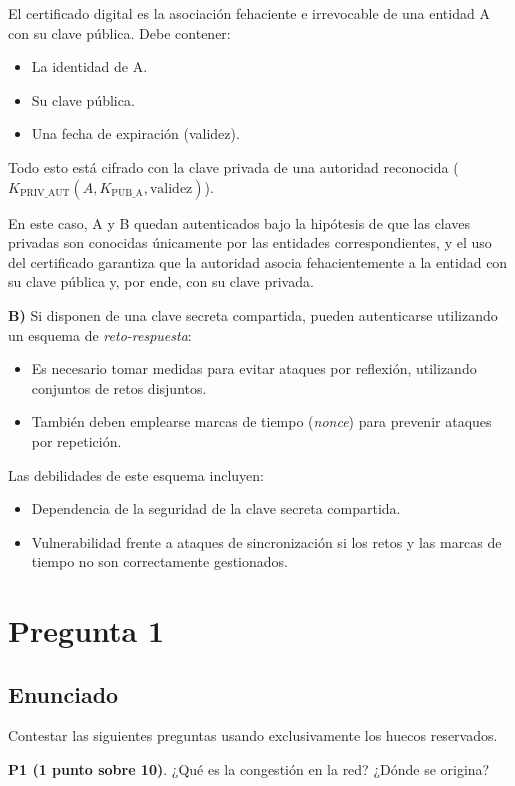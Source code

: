 \documentclass[12pt]{article}
\begin{document}
El certificado digital es la asociación fehaciente e irrevocable de una entidad A con su clave pública. Debe contener:
\begin{itemize}
    \item La identidad de A.
    \item Su clave pública.
    \item Una fecha de expiración (validez).
\end{itemize}
Todo esto está cifrado con la clave privada de una autoridad reconocida (\(K_{\text{PRIV\_AUT}}(A, K_{\text{PUB\_A}}, \text{validez})\)).

En este caso, A y B quedan autenticados bajo la hipótesis de que las claves privadas son conocidas únicamente por las entidades correspondientes, y el uso del certificado garantiza que la autoridad asocia fehacientemente a la entidad con su clave pública y, por ende, con su clave privada.

\textbf{B)} Si disponen de una clave secreta compartida, pueden autenticarse utilizando un esquema de \textit{reto-respuesta}:
\begin{itemize}
    \item Es necesario tomar medidas para evitar ataques por reflexión, utilizando conjuntos de retos disjuntos.
    \item También deben emplearse marcas de tiempo (\textit{nonce}) para prevenir ataques por repetición.
\end{itemize}

Las debilidades de este esquema incluyen:
\begin{itemize}
    \item Dependencia de la seguridad de la clave secreta compartida.
    \item Vulnerabilidad frente a ataques de sincronización si los retos y las marcas de tiempo no son correctamente gestionados.
\end{itemize}

\section{Pregunta 1}

\subsection{Enunciado}

Contestar las siguientes preguntas usando exclusivamente los huecos reservados.

\textbf{P1 (1 punto sobre 10)}. ¿Qué es la congestión en la red? ¿Dónde se origina?
\end{document}
